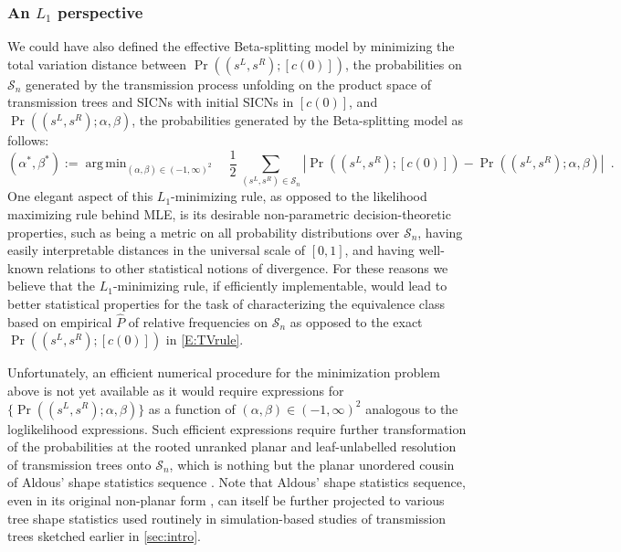 \documentclass[review]{elsarticle}
\numberwithin{equation}{section}
\let\orgautoref\autoref
\renewcommand{\autoref}
        {\def\equationautorefname{Eq.}%
         \def\figureautorefname{Fig.}%
         \def\subfigureautorefname{Fig.}%
         \def\sectionautorefname{Sect.}%
         \def\subsectionautorefname{Sect.}%
         \def\subsubsectionautorefname{Sect.}%
         \def\Itemautorefname{item}%
         \def\tableautorefname{Table}%
         \def\propositionautorefname{Prop.}%
         \def\corollaryautorefname{Corollary}%
         \def\theoremautorefname{Theorem}%
         \def\remarkautorefname{Remark}%
         \def\lemmaautorefname{Lemma}%
         \def\proofofautorefname{Proof}%
         \def\exampleautorefname{Example}%
         \orgautoref}
\DeclareMathOperator*{\argmin}{arg\,min}
\begin{document}
\subsubsection{An $L_1$ perspective}\label{S:AnL1Perspective}
We could have also defined the effective Beta-splitting model by minimizing the total variation distance between $\Pr((s^L,s^R);[c(0)])$, the probabilities on $\mathcal{S}_n$ generated by the transmission process unfolding on the product space of transmission trees and SICNs with initial SICNs in $[c(0)]$, and $\Pr((s^L,s^R); \alpha,\beta)$, the probabilities generated by the Beta-splitting model as follows:
\begin{equation}\label{E:TVrule}
(\alpha^*,\beta^*) := \argmin_{(\alpha,\beta) \in (-1,\infty)^2} \quad
\frac{1}{2} \, \sum_{(s^L,s^R) \in \mathcal{S}_n} \left| \Pr((s^L,s^R);[c(0)]) - \Pr((s^L,s^R); \alpha,\beta) \right| \enspace.
\end{equation}
One elegant aspect of this $L_1$-minimizing rule, as opposed to the likelihood maximizing rule behind MLE, is its desirable non-parametric decision-theoretic properties, such as being a metric on all probability distributions over $\mathcal{S}_n$, having easily interpretable distances in the universal scale of $[0,1]$, and having well-known relations to other statistical notions of divergence.  
For these reasons we believe that the $L_1$-minimizing rule, if efficiently implementable, would lead to better statistical properties for the task of characterizing the equivalence class based on empirical $\hat{P}$ of relative frequencies on $\mathcal{S}_n$ as opposed to the exact $\Pr((s^L,s^R); [c(0)])$ in \autoref{E:TVrule}.  

Unfortunately, an efficient numerical procedure for the minimization problem above is not yet available as it would require expressions 
for $\{\Pr((s^L,s^R); \alpha,\beta)\}$ as a function of $(\alpha,\beta) \in (-1,\infty)^2$ analogous to the loglikelihood expressions.
Such efficient expressions require further transformation of the probabilities at the rooted unranked planar and leaf-unlabelled resolution of transmission trees \cite[Lemma 4.1]{SainudiinVeber2016} onto $\mathcal{S}_n$, which is nothing but the planar unordered cousin of Aldous' shape statistics sequence \citep[Eqn.~(4.1)]{SainudiinStadlerVeber2015}.  
Note that  Aldous' shape statistics sequence, even in its original non-planar form \citep{Aldous2001}, can itself be further projected to various tree shape statistics \cite[p.~1231]{SainudiinStadlerVeber2015} used routinely in simulation-based studies of transmission trees sketched earlier in \autoref{sec:intro}. 
\end{document}
